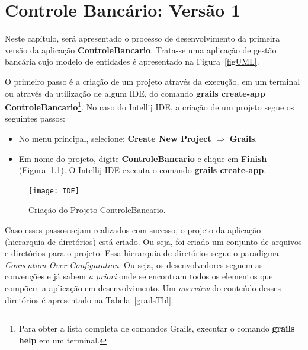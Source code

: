 \chapter{Controle Bancário: Versão 1}\label{bancario}

Neste  capítulo, será  apresentado  o processo  de  desenvolvimento da  primeira
versão  da aplicação {\bf  ControleBancario}. Trata-se  uma aplicação  de gestão
bancária cujo modelo de entidades é apresentado na Figura~\ref{figUML}.

\vspace{0.2cm}

O primeiro passo é  a criação de um projeto através da  execução, em um terminal
ou  através  da utilização  de  algum IDE,  do  comando  {\bf grails  create-app
  ControleBancario}\footnote{Para  obter a  lista completa  de  comandos Grails,
  executar o comando {\bf grails help} em um terminal.}.    No  caso do  Intellij  IDE,  a criação  de  um  projeto segue  os
seguintes passos: 

\vspace{0.2cm}

\begin{itemize}

\item No  menu principal, selecione: {\bf Create  New Project} $\Longrightarrow$
  {\bf Grails}.  

\vspace{0.2cm}

\item Em nome do projeto, digite {\bf ControleBancario} e clique em {\bf Finish}
  (Figura~\ref{criaProjFig}).   O Intellij  IDE  executa o  comando {\bf  grails
  create-app}. 

\end{itemize}

\begin{figure}[htbp]
\centering\texttt{[image: IDE]}
\caption{Criação do Projeto ControleBancario.}
\label{criaProjFig}
\end{figure}

Caso  esses  passos  sejam  realizados  com  sucesso,  o  projeto  da  aplicação
(hierarquia  de diretórios) está  criado.  Ou  seja, foi  criado um  conjunto de
arquivos  e diretórios para  o projeto.  Essa hierarquia  de diretórios  segue o
paradigma  {\it Convention  Over  Configuration}.  Ou  seja, os  desenvolvedores
seguem  as convenções  e já  sabem {\it  a priori}  onde se  encontram  todos os
elementos  que compõem  a aplicação  em desenvolvimento.   Um {\it  overview} do
conteúdo   desses   diretórios    é   apresentado   na   Tabela~\ref{grailsTbl}.

